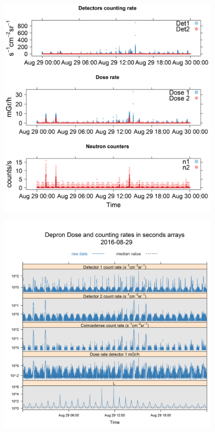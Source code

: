 \begin{figure}
	\centering
	\includegraphics[width=0.7\linewidth]{images/results/depron_sec_log_new08-29-16}
	\caption{}
	\label{fig:depronseclognew08-29-16}
\end{figure}

\begin{figure}
	\centering
	\includegraphics[width=0.7\linewidth]{images/results/depron_sec_log08-29-16}
	\caption{}
	\label{fig:depronseclog08-29-16}
\end{figure}




